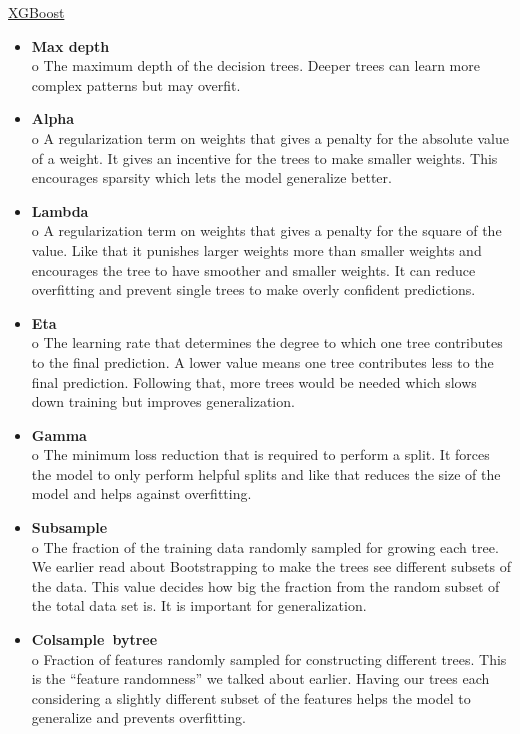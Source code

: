\documentclass[a4paper,12pt]{report}
\begin{document}
\begin{minipage}{\textwidth}
\underline{XGBoost}
\begin{itemize}
  \item \textbf{Max depth} \\
  o The maximum depth of the decision trees. Deeper trees can learn more complex patterns but may overfit.

  \item \textbf{Alpha} \\
  o A regularization term on weights that gives a penalty for the absolute value of a weight. It gives an incentive for the trees to make smaller weights. This encourages sparsity which lets the model generalize better.

\end{itemize}
\end{minipage}
\begin{itemize}

  \item \textbf{Lambda} \\
  o A regularization term on weights that gives a penalty for the square of the value. Like that it punishes larger weights more than smaller weights and encourages the tree to have smoother and smaller weights. It can reduce overfitting and prevent single trees to make overly confident predictions.

  \item \textbf{Eta} \\
  o The learning rate that determines the degree to which one tree contributes to the final prediction. A lower value means one tree contributes less to the final prediction. Following that, more trees would be needed which slows down training but improves generalization.

  \item \textbf{Gamma} \\
  o The minimum loss reduction that is required to perform a split. It forces the model to only perform helpful splits and like that reduces the size of the model and helps against overfitting.

  \item \textbf{Subsample} \\
  o The fraction of the training data randomly sampled for growing each tree. We earlier read about Bootstrapping to make the trees see different subsets of the data. This value decides how big the fraction from the random subset of the total data set is. It is important for generalization.

  \item \textbf{Colsample\ bytree} \\
  o Fraction of features randomly sampled for constructing different trees. This is the “feature randomness” we talked about earlier. Having our trees each considering a slightly different subset of the features helps the model to generalize and prevents overfitting.
\end{itemize}
\end{document}
